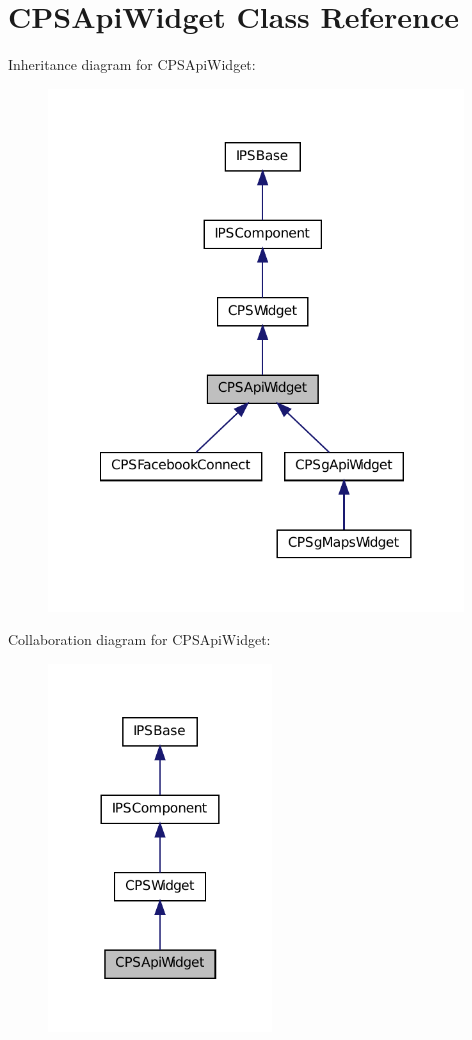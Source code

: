\hypertarget{classCPSApiWidget}{
\section{CPSApiWidget Class Reference}
\label{classCPSApiWidget}
}


Inheritance diagram for CPSApiWidget:\nopagebreak
\begin{figure}[H]
\begin{center}
\leavevmode
\includegraphics[width=312pt]{classCPSApiWidget__inherit__graph}
\end{center}
\end{figure}


Collaboration diagram for CPSApiWidget:\nopagebreak
\begin{figure}[H]
\begin{center}
\leavevmode
\includegraphics[width=168pt]{classCPSApiWidget__coll__graph}
\end{center}
\end{figure}
